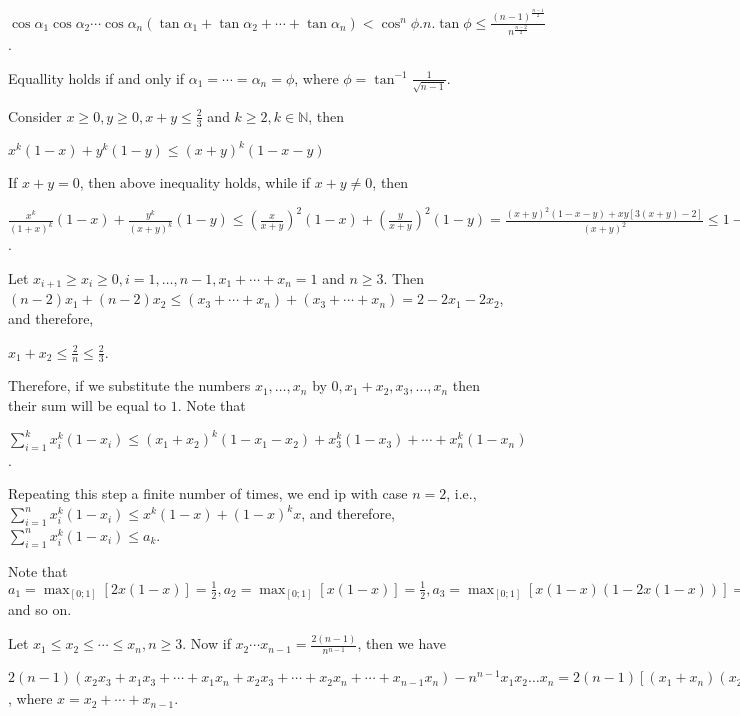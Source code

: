   $\cos\alpha_1\cos\alpha_2\cdots\cos\alpha_n(\tan\alpha_1 + \tan\alpha_2 + \cdots + \tan\alpha_n) <
  \cos^n\phi.n.\tan\phi\leq\frac{(n - 1)^{\frac{n - 1}{2}}}{n^{\frac{n - 2}{2}}}$.

  Equallity holds if and only if $\alpha_1 = \cdots = \alpha_n = \phi$, where $\phi =
  \tan^{-1}\frac{1}{\sqrt{n - 1}}$.
\item Consider $x\geq 0, y\geq 0, x + y\leq \frac{2}{3}$ and $k\geq 2, k\in\mathbb{N}$, then

  $x^k(1 - x) + y^k(1 - y)\leq(x + y)^k(1 - x - y)$

  If $x + y = 0$, then above inequality holds, while if $x + y\neq 0$, then

  $\frac{x^k}{(1 + x)^k}(1 - x) + \frac{y^k}{(x + y)^k}(1 - y)\leq \left(\frac{x}{x + y}\right)^2(1 - x) +
  \left(\frac{y}{x + y}\right)^2(1 - y) = \frac{(x + y)^2(1 - x - y) + xy[3(x + y) - 2]}{(x + y)^2}\leq 1 -
  x - y$.

  Let $x_{i + 1}\geq x_i\geq 0, i = 1, \ldots, n - 1, x_1 + \cdots + x_n = 1$ and $n\geq 3$. Then $(n -
  2)x_1 + (n - 2)x_2\leq (x_3 + \cdots + x_n) + (x_3 + \cdots + x_n) = 2 - 2x_1 - 2x_2$, and therefore,

  $x_1 + x_2\leq \frac{2}{n}\leq \frac{2}{3}$.

  Therefore, if we substitute the numbers $x_1, \ldots, x_n$ by $0, x_1 + x_2, x_3, \ldots, x_n$ then their
  sum will be equal to $1$. Note that

  $\displaystyle\sum_{i=1}^kx_i^k(1 - x_i)\leq (x_1 + x_2)^k(1 - x_1 - x_2) + x_3^k(1 - x_3) + \cdots +
  x_n^k(1 - x_n)$.

  Repeating this step a finite number of times, we end ip with case $n = 2$, i.e.,
  $\displaystyle\sum_{i=1}^nx_i^k(1 - x_i)\leq x^k(1 - x) + (1 - x)^kx$, and therefore,
  $\displaystyle\sum_{i = 1}^nx_i^k(1 - x_i)\leq a_k$.

  Note that $a_1 = \displaystyle\max_{[0;1]}[2x(1 - x)] = \frac{1}{2}, a_2 = \max_{[0;1]}[x(1 - x)] =
  \frac{1}{2}, a_3 = \max_{[0;1]}[x(1 - x)(1 - 2x(1 - x))] = \frac{1}{8}$ and so on.
\item Let $x_1\leq x_2\leq \cdots\leq x_n, n\geq 3$. Now if $x_2\cdots x_{n - 1} = \frac{2(n - 1)}{n^{n -
    1}}$, then we have

  $2(n - 1)(x_2x_3 + x_1x_3 + \cdots + x_1x_n + x_2x_3 + \cdots + x_2x_n + \cdots + x_{n - 1}x_n) - n^{n -
  1}x_1x_2\ldots x_n= 2(n - 1)[(x_1 + x_n)(x_2 + \cdots + x_{n - 1}) + x_2x_3 + \cdots + x_2x_{n - 1}] +
  x_1x_n[2(n - 1) - n^{n - 1}x_2\ldots x_{n - 1}]\leq 2(n - 1)[x(1 - x) + x_2x_3 + \cdots + x_2x_{n - 1} +
    \cdots + x_{n - 2}x_{n - 1}]$, where $x = x_2 + \cdots + x_{n - 1}$.

